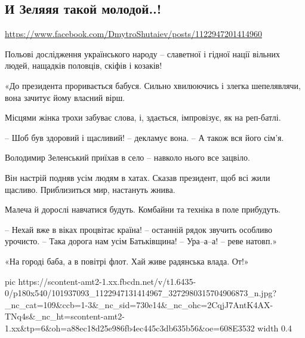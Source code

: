  
 
 
 
 

\subsection{И Зеляяя такой молодой..!}
\url{https://www.facebook.com/DmytroShutaiev/posts/1122947201414960}

Польові дослідження українського народу – славетної і гідної нації вільних людей, нащадків половців, скіфів і козаків!

«До президента проривається бабуся. Сильно хвилюючись і злегка шепелявлячи, вона зачитує йому власний вірш.

Місцями жінка трохи забуває слова, і, здається, імпровізує, як на реп-батлі.

– Шоб був здоровий і щасливий! – декламує вона. – А також вся його сім’я.

Володимир Зеленський приїхав в село – навколо нього все зацвіло.

Він настрій подняв усім людям в хатах. Сказав президент, щоб всі жили щасливо. Приблизиться мир, настануть жнива.

Малеча й дорослі навчатися будуть. Комбайни та техніка в поле прибудуть.

– Нехай вже в віках процвітає країна! – останній рядок звучить особливо урочисто. – Така дорога нам усім Батьківщина!
– Ура–а–а! – реве натовп.»

«На городі баба,
а в повітрі флот.
Хай живе радянська влада.
От!»


\ifcmt
  pic https://scontent-amt2-1.xx.fbcdn.net/v/t1.6435-0/p180x540/101937093_1122947131414967_3272980315704906873_n.jpg?_nc_cat=109&ccb=1-3&_nc_sid=730e14&_nc_ohc=2CqjJ7AntK4AX-TNq4s&_nc_ht=scontent-amt2-1.xx&tp=6&oh=a88ec18d25e986fb4ec445c3db635b56&oe=608E3532
  width 0.4
\fi

